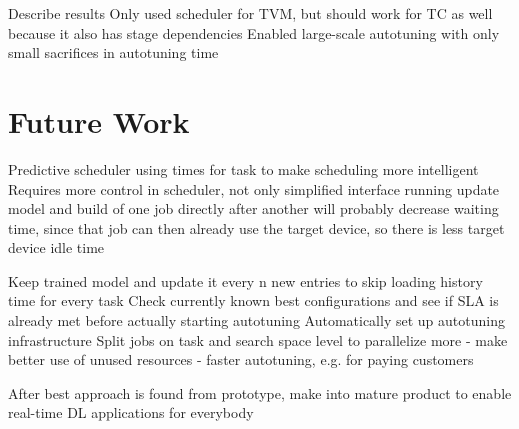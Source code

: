 Describe results
Only used scheduler for TVM, but should work for TC as well because it also has stage dependencies
Enabled large-scale autotuning with only small sacrifices in autotuning time

\section{Future Work}
Predictive scheduler using times for task to make scheduling more intelligent
Requires more control in scheduler, not only simplified interface
running update model and build of one job directly after another will probably decrease waiting time, since that job can then already use the target device, so there is less target device idle time

Keep trained model and update it every n new entries to skip loading history time for every task
Check currently known best configurations and see if SLA is already met before actually starting autotuning
Automatically set up autotuning infrastructure
Split jobs on task and search space level to parallelize more
- make better use of unused resources
- faster autotuning, e.g. for paying customers

After best approach is found from prototype, make into mature product to enable real-time DL applications for everybody
